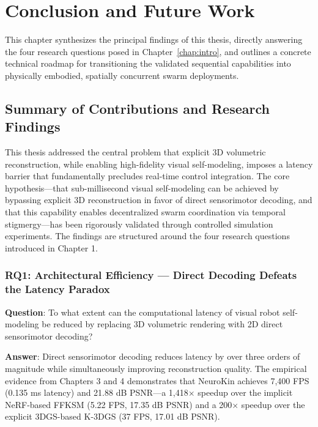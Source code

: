 \documentclass[12pt,a4paper,oneside]{report}
\begin{document}
\clearpage

\chapter{Conclusion and Future Work}
\label{chap:conclusion_future_work}

This chapter synthesizes the principal findings of this thesis, directly answering the four research questions posed in Chapter~\ref{chap:intro}, and outlines a concrete technical roadmap for transitioning the validated sequential capabilities into physically embodied, spatially concurrent swarm deployments.

\section{Summary of Contributions and Research Findings}

This thesis addressed the central problem that explicit 3D volumetric reconstruction, while enabling high-fidelity visual self-modeling, imposes a latency barrier that fundamentally precludes real-time control integration. The core hypothesis---that sub-millisecond visual self-modeling can be achieved by bypassing explicit 3D reconstruction in favor of direct sensorimotor decoding, and that this capability enables decentralized swarm coordination via temporal stigmergy---has been rigorously validated through controlled simulation experiments. The findings are structured around the four research questions introduced in Chapter 1.

\subsection{RQ1: Architectural Efficiency --- Direct Decoding Defeats the Latency Paradox}

\textbf{Question}: To what extent can the computational latency of visual robot self-modeling be reduced by replacing 3D volumetric rendering with 2D direct sensorimotor decoding?

\textbf{Answer}: Direct sensorimotor decoding reduces latency by over three orders of magnitude while simultaneously improving reconstruction quality. The empirical evidence from Chapters 3 and 4 demonstrates that NeuroKin achieves 7,400 FPS (0.135 ms latency) and 21.88 dB PSNR---a 1,418$\times$ speedup over the implicit NeRF-based FFKSM (5.22 FPS, 17.35 dB PSNR) and a 200$\times$ speedup over the explicit 3DGS-based K-3DGS (37 FPS, 17.01 dB PSNR).
\end{document}

